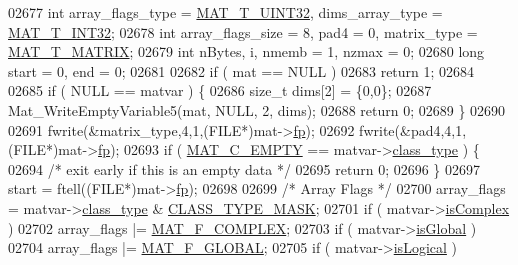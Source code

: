 \begin{DoxyCode}
{{{{{{{{{{{{{{{{02677     \textcolor{keywordtype}{int}      array\_flags\_type = \hyperlink{group___m_a_t_ggacf7b3b879282b7ab3a51190e49bf3453aa397e285a23fe240368b752897652c6a}{MAT\_T\_UINT32}, dims\_array\_type = 
      \hyperlink{group___m_a_t_ggacf7b3b879282b7ab3a51190e49bf3453a83e06a68320726c6572bfbb9f3addb1d}{MAT\_T\_INT32};
02678     \textcolor{keywordtype}{int}      array\_flags\_size = 8, pad4 = 0, matrix\_type = \hyperlink{group___m_a_t_ggacf7b3b879282b7ab3a51190e49bf3453a32985fee89a4df8db4b3f5d3a48823d3}{MAT\_T\_MATRIX};
02679     \textcolor{keywordtype}{int}      nBytes, i, nmemb = 1, nzmax = 0;
02680     \textcolor{keywordtype}{long}     start = 0, end = 0;
02681 
02682     \textcolor{keywordflow}{if} ( mat == NULL )
02683         \textcolor{keywordflow}{return} 1;
02684 
02685     \textcolor{keywordflow}{if} ( NULL == matvar ) \{
02686         \textcolor{keywordtype}{size\_t} dims[2] = \{0,0\};
02687         Mat\_WriteEmptyVariable5(mat, NULL, 2, dims);
02688         \textcolor{keywordflow}{return} 0;
02689     \}
02690 
02691     fwrite(&matrix\_type,4,1,(FILE*)mat->\hyperlink{struct__mat__t_a85f562e407ca9ad4d2a6e14f839432b7}{fp});
02692     fwrite(&pad4,4,1,(FILE*)mat->\hyperlink{struct__mat__t_a85f562e407ca9ad4d2a6e14f839432b7}{fp});
02693     \textcolor{keywordflow}{if} ( \hyperlink{group___m_a_t_ggad4d60ae7b709fc81bfd744fb4c857c40a5c76eef0ca0373d25abe49053be6fa9a}{MAT\_C\_EMPTY} == matvar->\hyperlink{group___m_a_t_aff13035bf3265dd7d9425e5d40c839d4}{class\_type} ) \{
02694         \textcolor{comment}{/* exit early if this is an empty data */}
02695         \textcolor{keywordflow}{return} 0;
02696     \}
02697     start = ftell((FILE*)mat->\hyperlink{struct__mat__t_a85f562e407ca9ad4d2a6e14f839432b7}{fp});
02698 
02699     \textcolor{comment}{/* Array Flags */}
02700     array\_flags = matvar->\hyperlink{group___m_a_t_aff13035bf3265dd7d9425e5d40c839d4}{class\_type} & \hyperlink{mat5_8c_a24b94e17e9c34b9c795798099c710751}{CLASS\_TYPE\_MASK};
02701     \textcolor{keywordflow}{if} ( matvar->\hyperlink{group___m_a_t_aeb03b3a69f108dc05470b00443a43739}{isComplex} )
02702         array\_flags |= \hyperlink{group___m_a_t_ggab9d6ef9e3ddca78a317b173f01d53fbbacd7b091a11184aad7fc6078c04470780}{MAT\_F\_COMPLEX};
02703     \textcolor{keywordflow}{if} ( matvar->\hyperlink{group___m_a_t_af26c71c4c0ddb14931d15910dddac1bc}{isGlobal} )
02704         array\_flags |= \hyperlink{group___m_a_t_ggab9d6ef9e3ddca78a317b173f01d53fbba49084e0c796aa7963e53f7539525d40d}{MAT\_F\_GLOBAL};
02705     \textcolor{keywordflow}{if} ( matvar->\hyperlink{group___m_a_t_a866c1539e68073a837833d74cd4a65be}{isLogical} )
}}}}}}}}}}}}}}}}
\end{DoxyCode}
